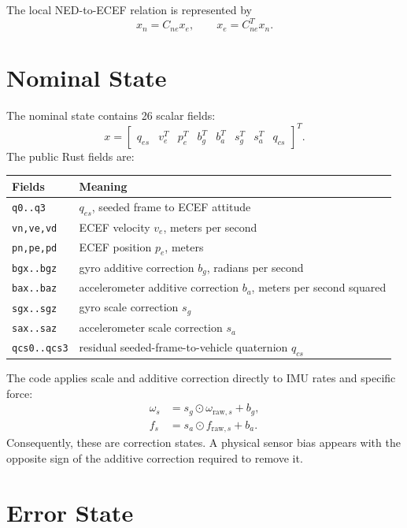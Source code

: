 \documentclass[11pt]{article}
\newcommand{\T}{^{T}}
\begin{document}
The local NED-to-ECEF relation is represented by
\begin{equation}
  x_n=C_{ne}x_e,\qquad x_e=C_{ne}\T x_n .
\end{equation}

\section{Nominal State}

The nominal state contains 26 scalar fields:
\begin{equation}
  x=
  \begin{bmatrix}
  q_{es} & v_e\T & p_e\T & b_g\T & b_a\T &
  s_g\T & s_a\T & q_{cs}
  \end{bmatrix}\T .
\end{equation}
The public Rust fields are:
\begin{center}
\begin{tabular}{ll}
\toprule
Fields & Meaning \\
\midrule
\texttt{q0..q3} & \(q_{es}\), seeded frame to ECEF attitude \\
\texttt{vn,ve,vd} & ECEF velocity \(v_e\), meters per second \\
\texttt{pn,pe,pd} & ECEF position \(p_e\), meters \\
\texttt{bgx..bgz} & gyro additive correction \(b_g\), radians per second \\
\texttt{bax..baz} & accelerometer additive correction \(b_a\), meters per second squared \\
\texttt{sgx..sgz} & gyro scale correction \(s_g\) \\
\texttt{sax..saz} & accelerometer scale correction \(s_a\) \\
\texttt{qcs0..qcs3} & residual seeded-frame-to-vehicle quaternion \(q_{cs}\) \\
\bottomrule
\end{tabular}
\end{center}

The code applies scale and additive correction directly to IMU rates and
specific force:
\begin{align}
  \omega_s &= s_g\odot\omega_{\mathrm{raw},s}+b_g,\\
  f_s &= s_a\odot f_{\mathrm{raw},s}+b_a.
\end{align}
Consequently, these are correction states. A physical sensor bias appears with
the opposite sign of the additive correction required to remove it.

\section{Error State}
\end{document}
